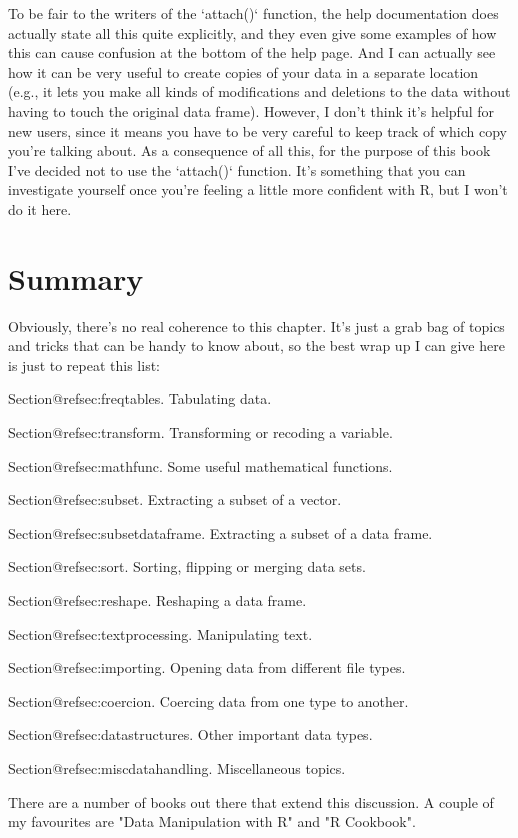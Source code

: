 To be fair to the writers of the `attach()` function, the help documentation does actually state all this quite explicitly, and they even give some examples of how this can cause confusion at the bottom of the help page. And I can actually see how it can be very useful to create copies of your data in a separate location (e.g., it lets you make all kinds of modifications and deletions to the data without having to touch the original data frame). However, I don't think it's helpful for new users, since it means you have to be very careful to keep track of which copy you're talking about. As a consequence of all this, for the purpose of this book I've decided not to use the `attach()` function. It's something that you can investigate yourself once you're feeling a little more confident with R, but I won't do it here. 




\section{Summary}

Obviously, there's no real coherence to this chapter. It's just a grab bag of topics and tricks that can be handy to know about, so the best wrap up I can give here is just to repeat this list:

 \itemsep 0pt
\item Section@refsec:freqtables. Tabulating data.
\item Section@refsec:transform. Transforming or recoding a variable.
\item Section@refsec:mathfunc. Some useful mathematical functions.
\item Section@refsec:subset. Extracting a subset of a vector.
\item Section@refsec:subsetdataframe. Extracting a subset of a data frame.
\item Section@refsec:sort. Sorting, flipping or merging data sets.
\item Section@refsec:reshape. Reshaping a data frame.
\item Section@refsec:textprocessing. Manipulating text.
\item Section@refsec:importing. Opening data from different file types.
\item Section@refsec:coercion. Coercing data from one type to another.
\item Section@refsec:datastructures. Other important data types.
\item Section@refsec:miscdatahandling. Miscellaneous topics.


There are a number of books out there that extend this discussion. A couple of my favourites are  "Data Manipulation with R" and  "R Cookbook". 







